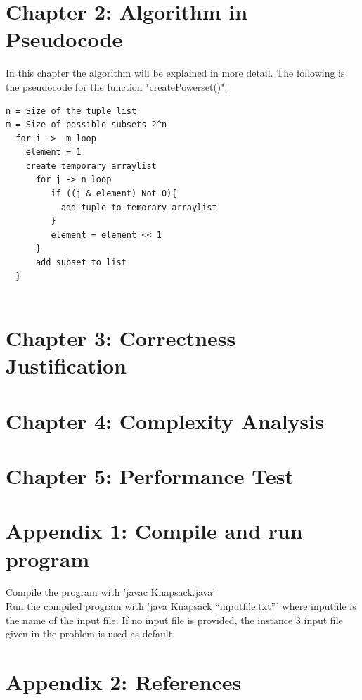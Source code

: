 \documentclass{article}
\begin{document}
\section*{Chapter 2: Algorithm in Pseudocode}
In this chapter the algorithm will be explained in more detail. The following is the pseudocode for the function "createPowerset()". \newline

\begin{verbatim}
n = Size of the tuple list 	
m = Size of possible subsets 2^n
  for i ->  m loop
    element = 1  
    create temporary arraylist  
      for j -> n loop
         if ((j & element) Not 0){
           add tuple to temorary arraylist
         }
         element = element << 1
      }
      add subset to list
  }
 
\end{verbatim}

\begin{tabbing}
 
\end{tabbing}






\section*{Chapter 3: Correctness Justification}

\section*{Chapter 4: Complexity Analysis}

\section*{Chapter 5: Performance Test}

\section*{Appendix 1: Compile and run program}
\noindent Compile the program with 'javac Knapsack.java'\\ 
\noindent Run the compiled program with 'java Knapsack ``inputfile.txt''' where inputfile is the name of the input file. If no input file is provided, the instance 3 input file given in the problem is used as default. 

\section*{Appendix 2: References}

\end{document}
